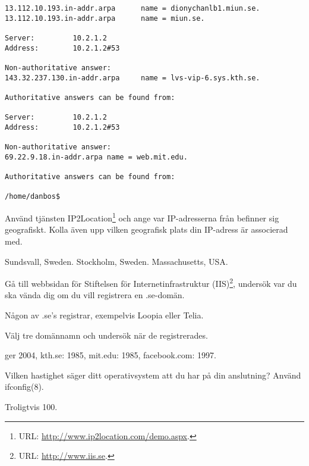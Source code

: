 \documentclass[11pt,a4paper]{miunasgn}
\begin{document}
\begin{questions}
\begin{solution}
\begin{lstlisting}
13.112.10.193.in-addr.arpa      name = dionychanlb1.miun.se.
13.112.10.193.in-addr.arpa      name = miun.se.

Server:         10.2.1.2
Address:        10.2.1.2#53

Non-authoritative answer:
143.32.237.130.in-addr.arpa     name = lvs-vip-6.sys.kth.se.

Authoritative answers can be found from:

Server:         10.2.1.2
Address:        10.2.1.2#53

Non-authoritative answer:
69.22.9.18.in-addr.arpa name = web.mit.edu.

Authoritative answers can be found from:

/home/danbos$ 
	\end{lstlisting}
\end{solution}

\question
Använd tjänsten IP2Location\footnote{%
	URL: \url{http://www.ip2location.com/demo.aspx}.
} och ange var IP-adresserna från  befinner sig
geografiskt.
Kolla även upp vilken geografisk plats din IP-adress är associerad med.
\begin{solution}
	Sundsvall, Sweden. Stockholm, Sweden. Massachusetts, USA.
\end{solution}

\question
Gå till webbsidan för Stiftelsen för Internetinfrastruktur (IIS)\footnote{%
	URL: \url{http://www.iis.se}.
}, undersök var du ska vända dig om du vill registrera en .se-domän.
\begin{solution}
	Någon av .se's registrar, exempelvis Loopia eller Telia.
\end{solution}

\question
Välj tre domännamn och undersök när de registrerades.
\begin{solution}
	 ger 2004,
	kth.se: 1985,
	mit.edu: 1985,
	facebook.com: 1997.
\end{solution}



\question
Vilken hastighet säger ditt operativsystem att du har på din anslutning?
Använd ifconfig(8).
\begin{solution}
	Troligtvis \unit{100}{\mega\bit\per\second}.
\end{solution}


\end{questions}
\end{document}
